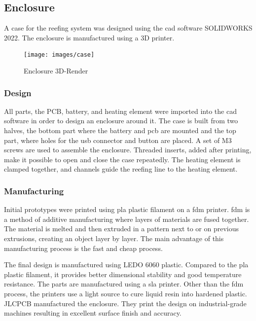 \newpage

\subsection{Enclosure}
A case for the reefing system was designed using the \acrshort{cad} software SOLIDWORKS 2022. The enclosure is manufactured using a 3D printer. 

\begin{figure}[h!]
	\centering
	\texttt{[image: images/case]}
	\caption{Enclosure 3D-Render}
	\label{fig:enclosure}
\end{figure}


\subsubsection{Design}
All parts, the PCB, battery, and heating element were imported into the \acrshort{cad} software in order to design an enclosure around it. The case is built from two halves, the bottom part where the battery and \acrshort{pcb} are mounted and the top part, where holes for the \acrshort{usb} connector and button are placed. A set of M3 screws are used to assemble the enclosure. Threaded inserts, added after printing, make it possible to open and close the case repeatedly. The heating element is clamped together, and channels guide the reefing line to the heating element. 

\subsubsection{Manufacturing}
Initial prototypes were printed using \acrshort{pla} plastic filament on a \acrshort{fdm} printer. \acrfull{fdm} is a method of additive manufacturing where layers of materials are fused together. The material is melted and then extruded in a pattern next to or on previous extrusions, creating an object layer by layer. The main advantage of this manufacturing process is the fast and cheap process. 

The final design is manufactured using LEDO 6060 plastic. Compared to the \acrshort{pla} plastic filament, it provides better dimensional stability and good temperature resistance. The parts are manufactured using a \acrfull{sla} printer. Other than the \acrshort{fdm} process, the printers use a light source to cure liquid resin into hardened plastic. JLCPCB manufactured the enclosure. They print the design on industrial-grade machines resulting in excellent surface finish and accuracy.


